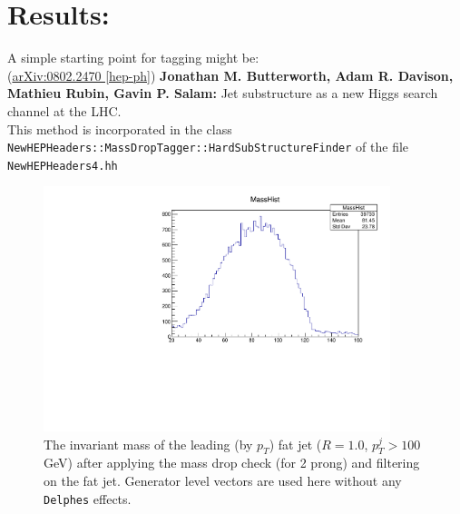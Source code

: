 \section{Results:}

A simple starting point for tagging might be:\\
(\href{https://arxiv.org/pdf/0802.2470.pdf}{arXiv:0802.2470 [hep-ph]}) {\bf Jonathan M. Butterworth, Adam R. Davison, Mathieu Rubin, Gavin P. Salam:} Jet substructure as a new Higgs search channel at the LHC.\\
This method is incorporated in the class {\tt NewHEPHeaders::MassDropTagger::HardSubStructureFinder} of the file {\tt NewHEPHeaders4.hh}

\begin{figure}
	\begin{center}
		\includegraphics[width=0.9\textwidth]{MassDropTaggerResult.pdf}
		\caption{
			The invariant mass of the leading (by $p_T$) fat jet ($R=1.0$, $p_T^{j}>100$ GeV) after applying the mass drop check (for 2 prong) and filtering on the fat jet. Generator level vectors are used here without any {\tt Delphes} effects.
		}
	\end{center}
\end{figure}


